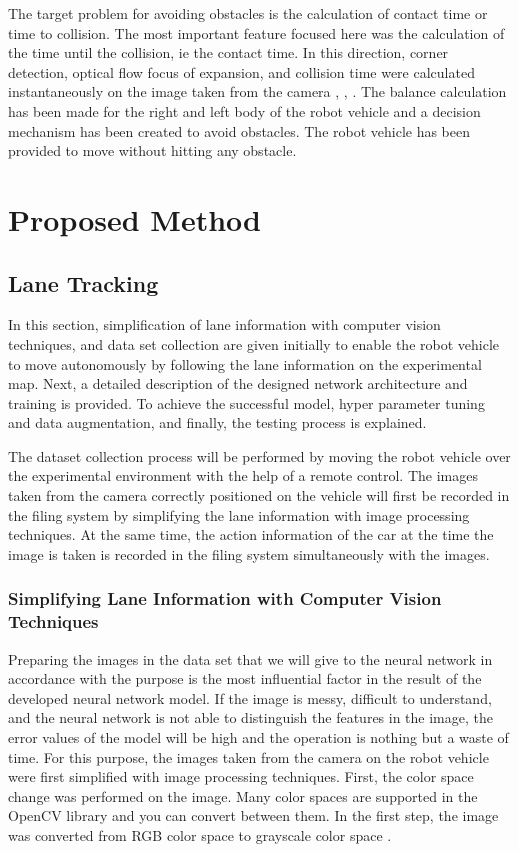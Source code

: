 \documentclass[twocolumn, switch]{article} %
\begin{document}
The target problem for avoiding obstacles is the calculation
of contact time or time to collision. The most important
feature focused here was the calculation of the time until the
collision, ie the contact time. In this direction, corner
detection, optical flow focus of expansion, and collision time
were calculated instantaneously on the image taken from the
camera \cite{o2005optical}, \cite{beauchemin1995computation}, \cite{barron2005tutorial}. 
The balance calculation has been made for
the right and left body of the robot vehicle and a decision
mechanism has been created to avoid obstacles. The robot
vehicle has been provided to move without hitting any
obstacle.

\section{Proposed Method}
\label{sec:proposed}

\subsection{Lane Tracking}

In this section, simplification of lane information with
computer vision techniques, and data set collection are given
initially to enable the robot vehicle to move autonomously
by following the lane information on the experimental map.
Next, a detailed description of the designed network
architecture and training is provided. To achieve the
successful model, hyper parameter tuning and data
augmentation, and finally, the testing process is explained.

The dataset collection process will be performed by moving
the robot vehicle over the experimental environment with the
help of a remote control. The images taken from the camera
correctly positioned on the vehicle will first be recorded in
the filing system by simplifying the lane information with
image processing techniques. At the same time, the action
information of the car at the time the image is taken is
recorded in the filing system simultaneously with the images.


\subsubsection{Simplifying Lane Information with Computer
Vision Techniques}

Preparing the images in the data set that we will give to the
neural network in accordance with the purpose is the most
influential factor in the result of the developed neural
network model. If the image is messy, difficult to
understand, and the neural network is not able to distinguish
the features in the image, the error values of the model will
be high and the operation is nothing but a waste of time. For
this purpose, the images taken from the camera on the robot
vehicle were first simplified with image processing
techniques. First, the color space change was performed on
the image. Many color spaces are supported in the OpenCV
library and you can convert between them. In the first step,
the image was converted from RGB color space to grayscale
color space \cite{saravanan2010color}.
\end{document}
